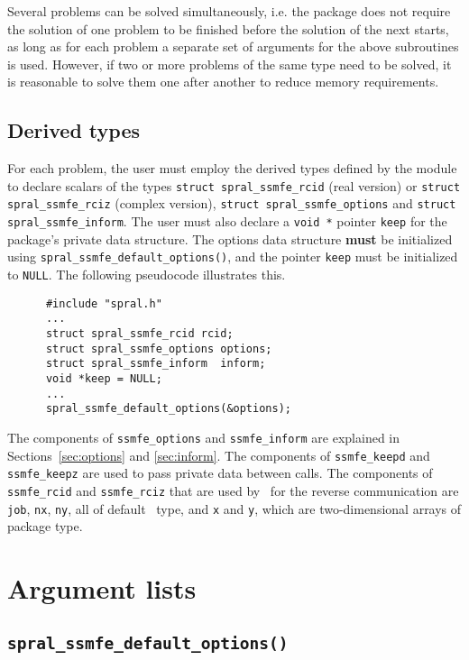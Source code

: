 Several problems can be solved simultaneously,
i.e. the package does not require the solution of
one problem to be finished before the solution of
the next starts, as long as for each problem a separate set
of arguments for the above subroutines is used.
However, if two or more problems of the same type
need to be solved, it is reasonable to solve them one
after another  to reduce  memory requirements.
\fi

\subsection{Derived types}
\label{derived types}
For each problem, the user must employ the derived types defined by the
module to declare scalars of the types 
{\tt struct spral\_ssmfe\_rcid} (real version) or 
{\tt struct spral\_ssmfe\_rciz} (complex version), 
{\tt struct spral\_ssmfe\_options} and 
{\tt struct spral\_ssmfe\_inform}. The user must also declare a \texttt{void *}
pointer \texttt{keep} for the package's private data structure. The options
data structure \textbf{must} be initialized using
\texttt{spral\_ssmfe\_default\_options()}, and the pointer \texttt{keep} must
be initialized to \texttt{NULL}.
The following pseudocode illustrates this.
\begin{verbatim}
      #include "spral.h"
      ...
      struct spral_ssmfe_rcid rcid;
      struct spral_ssmfe_options options;
      struct spral_ssmfe_inform  inform;
      void *keep = NULL;
      ...
      spral_ssmfe_default_options(&options);
\end{verbatim}

The components of 
{\tt ssmfe\_options} and 
{\tt ssmfe\_inform} are explained
in Sections~\ref{sec:options} and \ref{sec:inform}. 
The components of {\tt ssmfe\_keepd} and {\tt ssmfe\_keepz} 
are used to pass 
private data between calls. 
The components of
{\tt ssmfe\_rcid} and 
{\tt ssmfe\_rciz} 
that are used by \fullpackagename\ 
for the reverse communication are
{\tt job},
{\tt nx},
{\tt ny}, all of default \Integer\ type,
and
{\tt x} and {\tt y},
which are 
two-dimensional arrays
of package type.


\section{Argument lists}

\subsection{\texttt{spral\_ssmfe\_default\_options()}}

